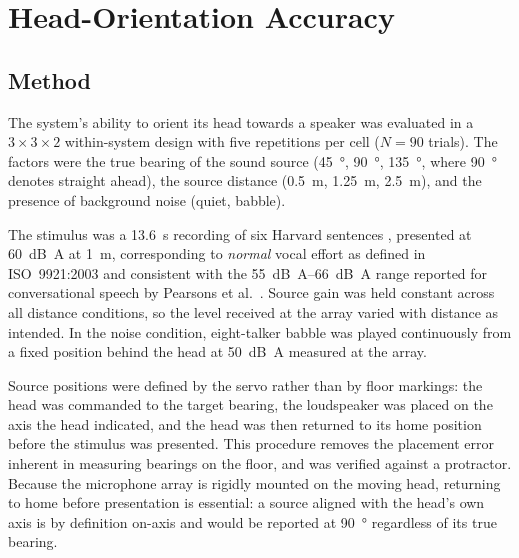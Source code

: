 
\section{Head-Orientation Accuracy}
\label{sec:head-orientation}

\subsection{Method}
\label{sec:head-orientation-method}

The system's ability to orient its head towards a speaker was evaluated in a
$3 \times 3 \times 2$ within-system design with five repetitions per cell
($N = 90$ trials). The factors were the true bearing of the sound source
(\SI{45}{\degree}, \SI{90}{\degree}, \SI{135}{\degree}, where \SI{90}{\degree}
denotes straight ahead), the source distance (\SI{0.5}{\metre},
\SI{1.25}{\metre}, \SI{2.5}{\metre}), and the presence of background noise
(quiet, babble).

The stimulus was a \SI{13.6}{\second} recording of six Harvard sentences
\cite{ieee1969}, presented at \SI{60}{\dB\A} at \SI{1}{\metre}, corresponding
to \emph{normal} vocal effort as defined in ISO~9921:2003 \cite{iso9921} and
consistent with the \SIrange{55}{66}{\dB\A} range reported for conversational
speech by Pearsons et al.\ \cite{pearsons1977}. Source gain was held constant
across all distance conditions, so the level received at the array varied with
distance as intended. In the noise condition, eight-talker babble was played
continuously from a fixed position behind the head at \SI{50}{\dB\A} measured
at the array.

Source positions were defined by the servo rather than by floor markings: the
head was commanded to the target bearing, the loudspeaker was placed on the
axis the head indicated, and the head was then returned to its home position
before the stimulus was presented. This procedure removes the placement error
inherent in measuring bearings on the floor, and was verified against a
protractor. Because the microphone array is rigidly mounted on the moving head,
returning to home before presentation is essential: a source aligned with the
head's own axis is by definition on-axis and would be reported at
\SI{90}{\degree} regardless of its true bearing.

